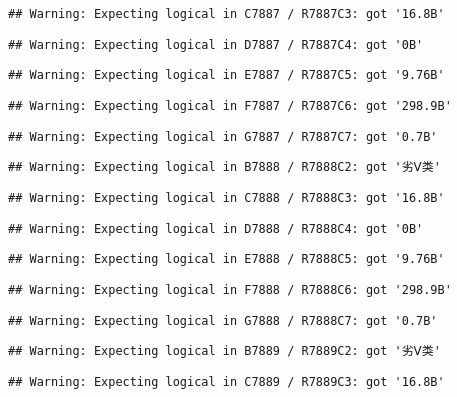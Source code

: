 \documentclass[
]{article}
\begin{document}
\begin{verbatim}
## Warning: Expecting logical in C7887 / R7887C3: got '16.8B'
\end{verbatim}

\begin{verbatim}
## Warning: Expecting logical in D7887 / R7887C4: got '0B'
\end{verbatim}

\begin{verbatim}
## Warning: Expecting logical in E7887 / R7887C5: got '9.76B'
\end{verbatim}

\begin{verbatim}
## Warning: Expecting logical in F7887 / R7887C6: got '298.9B'
\end{verbatim}

\begin{verbatim}
## Warning: Expecting logical in G7887 / R7887C7: got '0.7B'
\end{verbatim}

\begin{verbatim}
## Warning: Expecting logical in B7888 / R7888C2: got '劣Ⅴ类'
\end{verbatim}

\begin{verbatim}
## Warning: Expecting logical in C7888 / R7888C3: got '16.8B'
\end{verbatim}

\begin{verbatim}
## Warning: Expecting logical in D7888 / R7888C4: got '0B'
\end{verbatim}

\begin{verbatim}
## Warning: Expecting logical in E7888 / R7888C5: got '9.76B'
\end{verbatim}

\begin{verbatim}
## Warning: Expecting logical in F7888 / R7888C6: got '298.9B'
\end{verbatim}

\begin{verbatim}
## Warning: Expecting logical in G7888 / R7888C7: got '0.7B'
\end{verbatim}

\begin{verbatim}
## Warning: Expecting logical in B7889 / R7889C2: got '劣Ⅴ类'
\end{verbatim}

\begin{verbatim}
## Warning: Expecting logical in C7889 / R7889C3: got '16.8B'
\end{verbatim}
\end{document}
